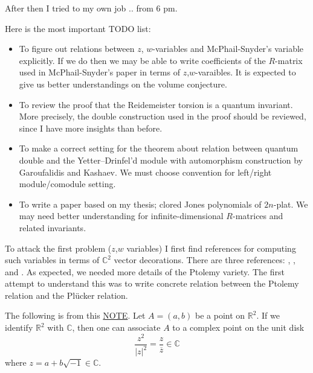 \documentclass[11pt]{amsart}
\begin{document}
\par\vspace{1em}

After then I tried to my own job .. from 6 pm.

Here is the most important TODO list:
\begin{itemize}
    \item To figure out relations between $z$, $w$-variables and McPhail-Snyder's variable explicitly.
    If we do then we may be able to write coefficients of the $R$-matrix used in McPhail-Snyder's paper in terms of $z$,$w$-varaibles.
    It is expected to give us better understandings on the volume conjecture.
    
    \item To review the proof that the Reidemeister torsion is a quantum invariant.
    More precisely, the double construction used in the proof should be reviewed, since I have more insights than before.

    \item To make a correct setting for the theorem about relation between quantum double and the Yetter--Drinfel'd module with automorphism construction by Garoufalidis and Kashaev.
    We must choose convention for left/right module/comodule setting.

    \item To write a paper based on my thesis; clored Jones polynomials of $2n$-plat.
    We may need better understanding for infinite-dimensional $R$-matrices and related invariants.
\end{itemize}

To attack the first problem ($z$,$w$ variables) I first find references for computing such variables in terms of $\mathbb{C}^2$ vector decorations.
There are three references: \cite{KKY-2023-Octa2}, \cite{Zickert-2009-Cvol}, and \cite{GTZ-2015-SLnCvol}.
As expected, we needed more details of the Ptolemy variety.
The first attempt to understand this was to write concrete relation between the Ptolemy relation and the Pl\"ucker relation.

The following is from this \href{https://web.evanchen.cc/notes/MIT-18-217.pdf}{NOTE}.
Let $A=(a, b)$ be a point on $\mathbb{R}^2$.
If we identify $\mathbb{R}^2$ with $\mathbb{C}$, then one can associate $A$ to a complex point on the unit disk
\[
    \frac{z^2}{|z|^2} = \frac{z}{\overline{z}} \in \mathbb{C}
\]
where $z = a + b\sqrt{-1} \in \mathbb{C}$.
\end{document}
